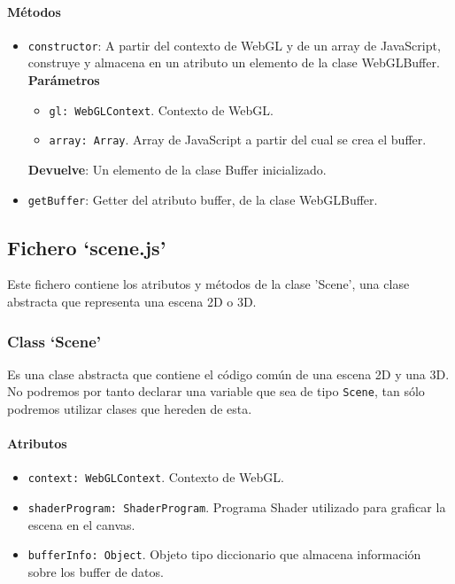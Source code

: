 \paragraph*{Métodos}
\begin{itemize}
    \item \verb|constructor|: A partir del contexto de WebGL y de un array de JavaScript, construye y almacena en un atributo un elemento de la clase WebGLBuffer.
    \textbf{Parámetros}
    \begin{itemize}
        \item \verb|gl: WebGLContext|. Contexto de WebGL.
        \item \verb|array: Array|. Array de JavaScript a partir del cual se crea el buffer.
    \end{itemize}
    \textbf{Devuelve}: Un elemento de la clase Buffer inicializado.
    
    \item \verb|getBuffer|: Getter del atributo buffer, de la clase WebGLBuffer.
\end{itemize}

\subsection{Fichero `scene.js'}

Este fichero contiene los atributos y métodos de la clase 'Scene', una clase abstracta que representa una escena 2D o 3D.

\subsubsection{Class `Scene'}
Es una clase abstracta que contiene el código común de una escena 2D y una 3D. No podremos por tanto declarar una variable que sea de tipo \verb|Scene|, tan sólo podremos utilizar clases que hereden de esta.

\paragraph*{Atributos}
\begin{itemize}
    \item \verb|context: WebGLContext|. Contexto de WebGL.
    \item \verb|shaderProgram: ShaderProgram|. Programa Shader utilizado para graficar la escena en el canvas.
    \item \verb|bufferInfo: Object|. Objeto tipo diccionario que almacena información sobre los buffer de datos.
\end{itemize}
